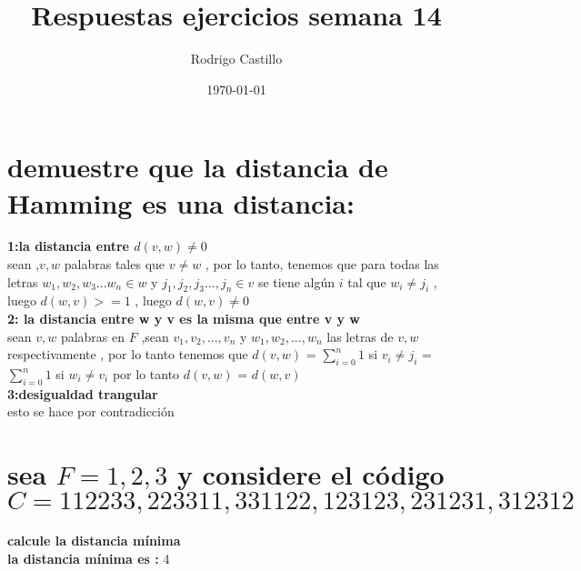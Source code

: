 \documentclass[10pt,a4paper]{article} %
\begin{document}
    \title{{ Respuestas ejercicios semana 14} }
    \author{{Rodrigo Castillo}}
    \date{\today}

    \maketitle


    \section{demuestre que la distancia de Hamming es una distancia:}
        \textbf{1:la distancia entre $d(v,w) \not= 0$ }
        \\
        sean ,$v,w$ palabras tales que $v \not= w$ , por lo tanto, tenemos que para
        todas las letras $w_1 , w_2 , w_3 ... w_n \in w$ y $j_1 , j_2 , j_3 ... ,
        j_n \in v$ se tiene algún $i$ tal que $w_i \not= j_i$ , luego $d(w,v) >= 1
        $  , luego $d(w,v) \not= 0$
        \\
        \textbf{2: la distancia entre w y v es la misma que entre v y w }
        \\
        sean $v,w$ palabras en $F$ ,sean $v_1 , v_2 , ... , v_n$  y $w_1 ,w_2 , ...
        ,w_n$ las letras de $v,w$ respectivamente , por lo tanto tenemos que
        $d(v,w)$ = $\sum_{i=0}^{n} 1$ si $v_i \not= j_i$  = $\sum_{i=0}^{n} 1$ si
        $w_i \not= v_i$ por lo tanto $d(v,w)$ = $d(w,v)$
        \\
        \textbf{3:desigualdad trangular}
        \\
        esto se hace por contradicción
        \section{sea $F = {1,2,3}$ y considere el código
        \\
         $C = {112233,223311 ,
        331122 , 123123 , 231231 , 312312}$}

        \textbf{calcule la distancia mínima}
        \\
        \textbf{la distancia mínima es :} 4
\end{document}
